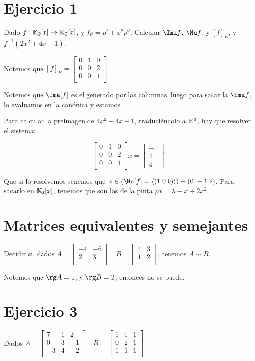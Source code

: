 \documentclass{article}
\begin{document}
\section*{Ejercicio 1}
Dado $f : \mathbb{K}_2[x] \to \mathbb{K}_2[x]$, y $fp = p' + x^2p''$.
Calcular $\Ima f$, $\Nu f$, y $[f]_E$, y $f^{-1} (2x^2 + 4x -1)$.

Notemos que $
[f]_E = 
\begin{bmatrix}
	0 & 1 & 0 \\
	0 & 0 & 2 \\
	0 & 0 & 1 \\
\end{bmatrix}
$

Notemos que $\Ima [f]$ es el generado por las columnas, luego para sacar la
$\Ima f$, lo evaluamos en la canónica y estamos.

Para calcular la preimagen de $4x^2 + 4x - 1$, traduciéndolo a $\mathbb{K}^3$,
hay que resolver el sistema:

\[
\begin{bmatrix}
	0 & 1 & 0 \\
	0 & 0 & 2 \\
	0 & 0 & 1 \\
\end{bmatrix} x = 
\begin{bmatrix}
	-1 \\ 4 \\ 4
\end{bmatrix}
\]

Que si lo resolvemos tenemos que $x \in (\Nu [f] = \langle (1 \; 0\; 0) \rangle
)+ (0 \; -1 \; 2)$.
Para sacarlo en $\mathbb{K}_2[x]$, tenemos que son los de la pinta $px = \lambda - x +
2x^2$.

\section*{Matrices equivalentes y semejantes}
Decidir si, dados
$
A = 
\begin{bmatrix}
	-4 & -6 \\
	2 & 3 \\
\end{bmatrix}
\quad
B = 
\begin{bmatrix}
	4 & 3 \\
	1 & 2 \\
\end{bmatrix}
$, tenemos $A \sim B$.

Notemos que $\rg A = 1$, y $\rg B = 2$, entonces no se puede.

\section*{Ejercicio 3}
Dados
$
A=
\begin{bmatrix}
	7&1&2\\
	0 & 3 & -1 \\
	-3 & 4 & -2 \\
\end{bmatrix}
\quad
B=
\begin{bmatrix}
	1&0&1\\
	0 & 2 & 1 \\
	1 & 1 & 1 \\
\end{bmatrix}
$
\end{document}
